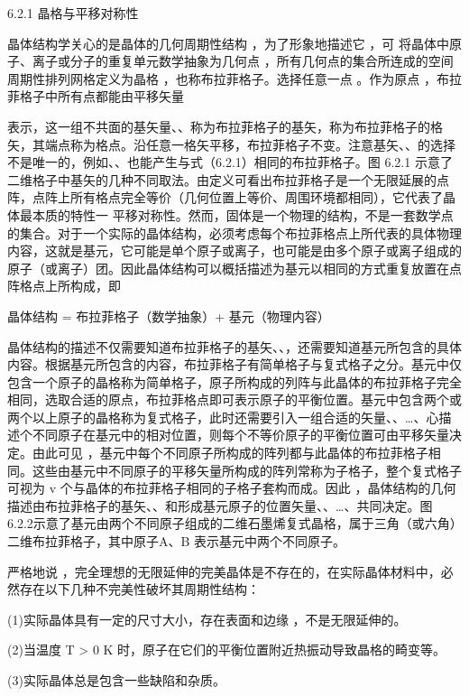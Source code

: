 6.2.1 晶格与平移对称性

晶体结构学关心的是晶体的几何周期性结构 ，为了形象地描述它 ，可 将晶体中原子、离子或分子的重复单元数学抽象为几何点 ，所有几何点的集合所连成的空间周期性排列网格定义为晶格 ，也称布拉菲格子。选择任意一点 。作为原点 ，布拉菲格子中所有点都能由平移矢量



表示，这一组不共面的基矢量、、称为布拉菲格子的基矢，称为布拉菲格子的格矢，其端点称为格点。沿任意一格矢平移，布拉菲格子不变。注意基矢、、的选择不是唯一的，例如、、也能产生与式（6.2.1）相同的布拉菲格子。图 6.2.1 示意了二维格子中基矢的几种不同取法。由定义可看出布拉菲格子是一个无限延展的点阵，点阵上所有格点完全等价（几何位置上等价、周围环境都相同），它代表了晶体最本质的特性一 平移对称性。然而，固体是一个物理的结构，不是一套数学点的集合。对于一个实际的晶体结构，必须考虑每个布拉菲格点上所代表的具体物理内容，这就是基元，它可能是单个原子或离子，也可能是由多个原子或离子组成的原子（或离子）团。因此晶体结构可以概括描述为基元以相同的方式重复放置在点阵格点上所构成，即

晶体结构 = 布拉菲格子（数学抽象）+ 基元（物理内容）

晶体结构的描述不仅需要知道布拉菲格子的基矢、、，还需要知道基元所包含的具体内容。根据基元所包含的内容，布拉菲格子有简单格子与复式格子之分。基元中仅包含一个原子的晶格称为简单格子，原子所构成的列阵与此晶体的布拉菲格子完全相同，选取合适的原点，布拉菲格点即可表示原子的平衡位置。基元中包含两个或两个以上原子的晶格称为复式格子，此时还需要引入一组合适的矢量、、…、心描述个不同原子在基元中的相对位置，则每个不等价原子的平衡位置可由平移矢量决定。由此可见 ，基元中每个不同原子所构成的阵列都与此晶体的布拉菲格子相同。这些由基元中不同原子的平移矢量所构成的阵列常称为子格子，整个复式格子可视为 v 个与晶体的布拉菲格子相同的子格子套构而成。因此 ，晶体结构的几何描述由布拉菲格子的基矢、、和形成基元原子的位置矢量、、…、共同决定。图 6.2.2示意了基元由两个不同原子组成的二维石墨烯复式晶格，属于三角（或六角）二维布拉菲格子，其中原子A、B 表示基元中两个不同原子。



严格地说 ，完全理想的无限延伸的完美晶体是不存在的，在实际晶体材料中，必然存在以下几种不完美性破坏其周期性结构：

(1)实际晶体具有一定的尺寸大小，存在表面和边缘 ，不是无限延伸的。

(2)当温度 T > 0 K 时，原子在它们的平衡位置附近热振动导致晶格的畸变等。

(3)实际晶体总是包含一些缺陷和杂质。



